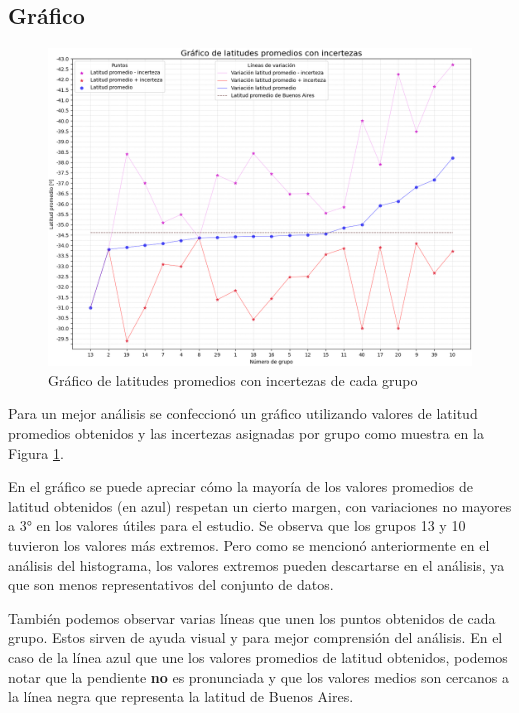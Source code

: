 \documentclass[11pt, a4paper]{article} %
\begin{document}
\subsection{Gráfico}
\begin{figure}[H]
    \centering
    \includegraphics[width=15cm]{images/gráfico_análisis.png}
    \caption{Gráfico de latitudes promedios con incertezas de cada grupo}
    \label{fig:grafico}
\end{figure}

Para un mejor análisis se confeccionó un gráfico utilizando valores de latitud promedios obtenidos y las incertezas asignadas por grupo como muestra en la Figura \ref{fig:grafico}.

En el gráfico se puede apreciar cómo la mayoría de los valores promedios de latitud obtenidos (en azul) respetan un cierto margen, con variaciones no mayores a $\ang{3}$ en los valores útiles para el estudio. Se observa que los grupos 13 y 10 tuvieron los valores más extremos. Pero como se mencionó anteriormente en el análisis del histograma, los valores extremos pueden descartarse en el análisis, ya que son menos representativos del conjunto de datos.

También podemos observar varias líneas que unen los puntos obtenidos de cada grupo. Estos sirven de ayuda visual y para mejor comprensión del análisis. En el caso de la línea azul que une los valores promedios de latitud obtenidos, podemos notar que la pendiente \textbf{no} es pronunciada y que los valores medios son cercanos a la línea negra que representa la latitud de Buenos Aires. 
\end{document}
